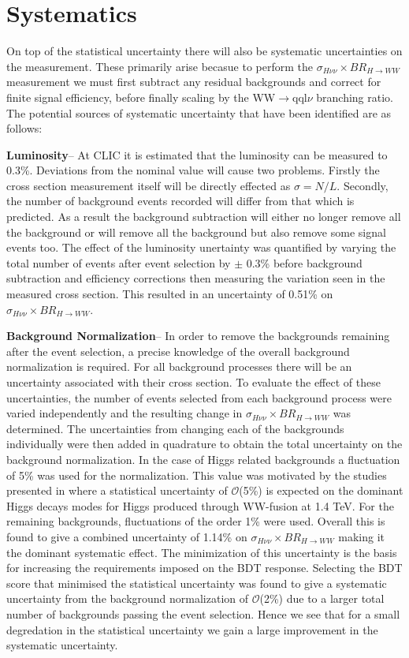 \section{Systematics}
\label{higgsSystematics}
On top of the statistical uncertainty there will also be systematic uncertainties on the measurement. These primarily arise becasue to perform the $\sigma_{H\nu\nu}\times BR_{H\rightarrow WW}$ measurement we must first subtract any residual backgrounds and correct for finite signal efficiency, before finally scaling by the WW$\rightarrow$qql$\nu$ branching ratio. The potential sources of systematic uncertainty that have been identified are as follows:

\textbf{Luminosity}-- At \ac{CLIC} it is estimated that the luminosity can be measured to 0.3\%. Deviations from the nominal value will cause two problems. Firstly the cross section measurement itself will be directly effected as $\sigma=N/L$. Secondly, the number of background events recorded will differ from that which is predicted. As a result the background subtraction will either no longer remove all the background or will remove all the background but also remove some signal events too. The effect of the luminosity unertainty was quantified by varying the total number of events after event selection by $\pm$ 0.3\% before background subtraction and efficiency corrections then measuring the variation seen in the measured cross section. This resulted in an uncertainty of 0.51\% on $\sigma_{H\nu\nu}\times BR_{H\rightarrow WW}$.

\textbf{Background Normalization}-- In order to remove the backgrounds remaining after the event selection, a precise knowledge of the overall background normalization is required. For all background processes there will be an uncertainty associated with their cross section. To evaluate the effect of these uncertainties, the number of events selected from each background process were varied independently and the resulting change in $\sigma_{H\nu\nu}\times BR_{H\rightarrow WW}$ was determined. The uncertainties from changing each of the backgrounds individually were then added in quadrature to obtain the total uncertainty on the background normalization. In the case of Higgs related backgrounds a fluctuation of 5\% was used for the normalization. This value was motivated by the studies presented in  \cite{Abramowicz:2016zbo} where a statistical uncertainty of $\mathcal{O}$(5\%) is expected on the dominant Higgs decays modes for Higgs produced through WW-fusion at 1.4 TeV. For the remaining backgrounds, fluctuations of the order 1\% were used. Overall this is found to give a combined uncertainty of 1.14\% on $\sigma_{H\nu\nu}\times BR_{H\rightarrow WW}$ making it the dominant systematic effect. The minimization of this uncertainty is the basis for increasing the requirements imposed on the BDT response. Selecting the BDT score that minimised the statistical uncertainty was found to give a systematic uncertainty from the background normalization of $\mathcal{O}$(2\%) due to a larger total number of backgrounds passing the event selection. Hence we see that for a small degredation in the statistical uncertainty we gain a large improvement in the systematic uncertainty.

